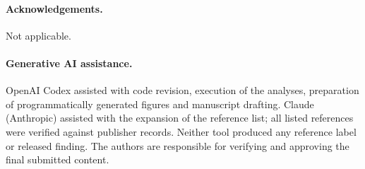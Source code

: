 \documentclass[10pt,a4paper]{article}
\begin{document}
\paragraph{Acknowledgements.} Not applicable.

\paragraph{Generative AI assistance.} OpenAI Codex assisted with code revision, execution of the analyses, preparation of programmatically generated figures and manuscript drafting. Claude (Anthropic) assisted with the expansion of the reference list; all listed references were verified against publisher records. Neither tool produced any reference label or released finding. The authors are responsible for verifying and approving the final submitted content.
\end{document}
